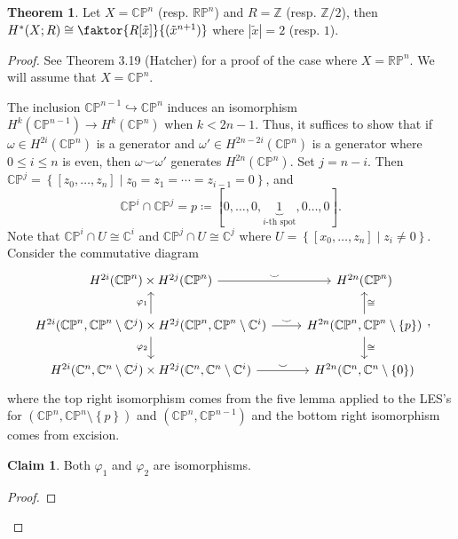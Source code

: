 \documentclass[10pt,letterpaper,cm]{nupset}
\theoremstyle{definition}
\theoremstyle{theorem}
\newtheorem{theorem}[definition]{Theorem}
\newtheorem*{claim}{Claim}
\theoremstyle{remark}
\newcommand{\C}{\mathbb C}
\newcommand{\CP}{\mathbb{CP}}
\newcommand{\RP}{\mathbb{RP}}
\newcommand{\Z}{\mathbb Z}
\newcommand{\1}{\mathbb{1}}
\newcommand{\0}{\vec 0}
\begin{document}
\begin{theorem}
Let $X = \CP^n$ (resp. $\RP^n$) and $R = \Z$ (resp. $\Z/2$), then $H^{\ast}(X; R) \cong \faktor{R[\tilde{x}]}{(\tilde{x}^{n+1})}$ where $\left\lvert{\tilde{x}}\right\rvert =2$ (resp. $1$).
\end{theorem}
\begin{proof}
See Theorem 3.19 (Hatcher) for a proof of the case where $X= \RP^n$. We will assume that $X = \CP^n$.

\medskip

 The inclusion $\CP^{n-1} \hookrightarrow \CP^n$ induces an isomorphism $H^k(\CP^{n-1}) \to H^k(\CP^n)$ when $k < 2n-1$. Thus, it suffices to show that if $\omega \in H^{2i}(\CP^n)$ is a generator and $\omega ' \in H^{2n -2i}(\CP^n)$ is a generator where $0\leq i \leq n$ is even, then $\omega \smile \omega '$ generates $H^{2n}(\CP^n)$. Set $j = n-i$. Then $\CP^j = \left\{\left[z_0, \ldots, z_n\right] \mid z_0 = z_1 = \cdots = z_{i-1}= 0\right\}$, and $$\CP^i \cap \CP^j = p\coloneqq  \left[0, \ldots, 0, \underbrace{1}_{i\text{-th spot}}, 0 \ldots, 0\right].$$ Note that $\CP^i \cap U \cong \C^i$ and $\CP^j \cap U \cong \C^j$ where $U = \left\{\left[x_0, \ldots, z_n\right] \mid z_i \ne 0\right\}$. Consider the commutative diagram
\[
\begin{tikzcd}
H^{2i}(\CP^n)\times H^{2j}(\CP^n) \arrow[r, "\smile"]                                                                                              & H^{2n}(\CP^n)                                                                 \\
{H^{2i}(\CP^n, \CP^n \setminus \C^j)\times H^{2j}(\CP^n, \CP^n \setminus \C^i)} \arrow[r, "\smile"] \arrow[u, "\varphi_1"] \arrow[d, "\varphi_2"'] & {H^{2n}(\CP^n, \CP^n \setminus \{p\})} \arrow[u, "\cong"'] \arrow[d, "\cong"] \\
{H^{2i}(\C^n, \C^n \setminus \C^j)\times H^{2j}(\C^n, \C^n \setminus \C^i)} \arrow[r, "\smile"]                                                    & {H^{2n}(\C^n, \C^n \setminus \left\{0\right\})}                                         
\end{tikzcd}
,\] where the top right isomorphism comes from the five lemma applied to the LES's for $\left(\CP^n, \CP^n \setminus \left\{p\right\}\right)$ and $\left(\CP^n, \CP^{n-1}\right)$ and the bottom right isomorphism comes from excision. 
\begin{claim}
Both $\varphi_1$ and $\varphi_2$ are isomorphisms. 
\end{claim}
\begin{proof}

\end{proof}
\end{proof}
\end{document}
